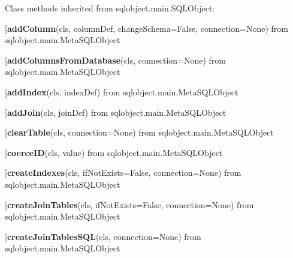 Class methods inherited from sqlobject.main.SQLObject:\\
\begin{description}\item[{\bf addColumn}(cls, columnDef, changeSchema=False, connection=None) from sqlobject.main.MetaSQLObject\end{description}

\begin{description}\item[{\bf addColumnsFromDatabase}(cls, connection=None) from sqlobject.main.MetaSQLObject\end{description}

\begin{description}\item[{\bf addIndex}(cls, indexDef) from sqlobject.main.MetaSQLObject\end{description}

\begin{description}\item[{\bf addJoin}(cls, joinDef) from sqlobject.main.MetaSQLObject\end{description}

\begin{description}\item[{\bf clearTable}(cls, connection=None) from sqlobject.main.MetaSQLObject\end{description}

\begin{description}\item[{\bf coerceID}(cls, value) from sqlobject.main.MetaSQLObject\end{description}

\begin{description}\item[{\bf createIndexes}(cls, ifNotExists=False, connection=None) from sqlobject.main.MetaSQLObject\end{description}

\begin{description}\item[{\bf createJoinTables}(cls, ifNotExists=False, connection=None) from sqlobject.main.MetaSQLObject\end{description}

\begin{description}\item[{\bf createJoinTablesSQL}(cls, connection=None) from sqlobject.main.MetaSQLObject\end{description}

